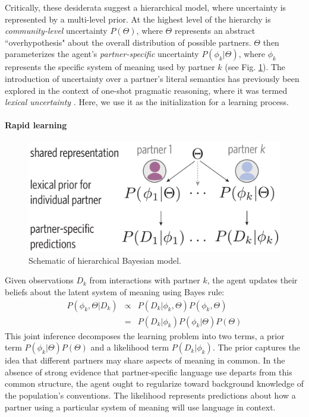 Critically, these desiderata suggest a hierarchical model, where uncertainty is represented by a multi-level prior. 
At the highest level of the hierarchy is \emph{community-level} uncertainty $P(\Theta)$, where $\Theta$ represents an abstract ``overhypothesis" about the overall distribution of possible partners. 
$\Theta$ then parameterizes the agent's \emph{partner-specific} uncertainty $P(\phi_{k} | \Theta)$, where $\phi_k$ represents the specific system of meaning used by partner $k$ (see Fig. \ref{fig:model_schematic}). 
The introduction of uncertainty over a partner's literal semantics has previously been explored in the context of one-shot pragmatic reasoning, where it was termed \emph{lexical uncertainty} \cite{smith_learning_2013,bergen_pragmatic_2016}. 
Here, we use it as the initialization for a learning process.

\paragraph{Rapid learning}

\begin{figure}[t!]
\includegraphics[scale=0.4]{./figures/task1_model.pdf}
\vspace{1em}
\caption{Schematic of hierarchical Bayesian model.}
\label{fig:model_schematic}
\end{figure}

Given observations $D_k$ from interactions with partner $k$, the agent updates their beliefs about the latent system of meaning using Bayes rule:
\begin{equation}
\begin{array}{rcl}
\label{eq:joint_inference}
P(\phi_k, \Theta | D_k)  & \propto &  P(D_k | \phi_k, \Theta) P(\phi_k, \Theta) \\
                           & =   & P(D_k | \phi_k) P(\phi_k | \Theta) P(\Theta)
\end{array}
\end{equation}
This joint inference decomposes the learning problem into two terms, a prior term $P(\phi_k | \Theta)P(\Theta)$ and a likelihood term $P(D_k | \phi_k)$.
The prior captures the idea that different partners may share aspects of meaning in common.
In the absence of strong evidence that partner-specific language use departs from this common structure, the agent ought to regularize toward background knowledge of the population's conventions.
The likelihood represents predictions about how a partner using a particular system of meaning will use language in context.

